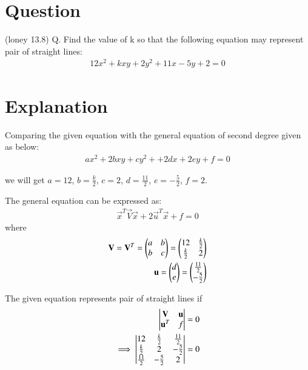 \documentclass[journal,12pt,twocolumn]{IEEEtran}
\begin{document}
\section{\textbf{Question}}
(loney 13.8) Q. Find the value of k so that the following equation may represent pair of straight lines: 
\begin{align}
    12x^2+kxy+2y^2+11x-5y+2=0\label{eq:1.1}
\end{align}
\section{\textbf{Explanation}}

Comparing the given equation with the general equation of second degree given as below:
\begin{align}
    ax^2+2bxy+cy^2++2dx+2ey+f=0\label{eq:2.1}
\end{align}

we will get $a=12$, $b=\frac{k}{2}$, $c=2$, $d=\frac{11}{2}$, $e=-\frac{5}{2}$, $f=2$.

The general equation can be expressed as:
\begin{align}
    \vec{x}^T\vec{V}\vec{x}+2\vec{u}^T\vec{x}+f=0\label{eq:2.2}
\end{align}
where
\begin{align}
    \mathbf{V}=\mathbf{V}^T=\begin{pmatrix}a & b \\ b & c\end{pmatrix}=\begin{pmatrix}12 & \frac{k}{2} \\ \frac{k}{2} & 2\end{pmatrix}\label{eq:2.3}\\
    \mathbf{u}=\begin{pmatrix}d \\ e\end{pmatrix}=\begin{pmatrix}\frac{11}{2} \\ -\frac{5}{2}\end{pmatrix}\label{eq:2.4}
\end{align}

The given equation represents pair of straight lines if
\begin{align}
    \begin{vmatrix}\mathbf{V} & \mathbf{u} \\ \mathbf{u}^T & f\end{vmatrix}=0\\
    \implies\label{eq:2.6}\begin{vmatrix}12 & \frac{k}{2} & \frac{11}{2} \\ \frac{k}{2} & 2 & -\frac{5}{2} \\ \frac{11}{2} & -\frac{5}{2} & 2\end{vmatrix}=0
\end{align}
\end{document}
